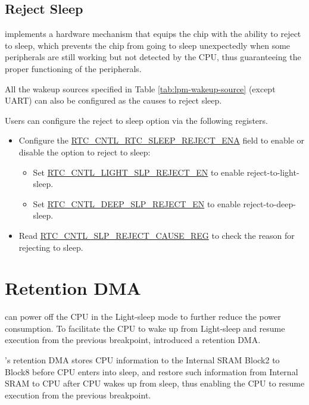 \documentclass[main\_\_EN.tex]{subfiles}
\begin{document}
\subsection{Reject Sleep}\label{sec:lpm-reject-source}

\chipname{} implements a hardware mechanism that equips the chip with the ability to reject to sleep, which prevents the chip from going to sleep unexpectedly when some peripherals are still working but not detected by the CPU, thus guaranteeing the proper functioning of the peripherals.

All the wakeup sources specified in Table \ref{tab:lpm-wakeup-source} (except UART) can also be configured as the causes to reject sleep.

Users can configure the reject to sleep option via the following registers.
\begin{itemize}
    \item Configure the \hyperref[fielddesc:RTCCNTLRTCSLEEPREJECTENA]{RTC\_CNTL\_RTC\_SLEEP\_REJECT\_ENA} field to enable or disable the option to reject to sleep:
        \begin{itemize}
            \item Set \hyperref[fielddesc:RTCCNTLLIGHTSLPREJECTEN]{RTC\_CNTL\_LIGHT\_SLP\_REJECT\_EN} to enable reject-to-light-sleep.
            \item Set \hyperref[fielddesc:RTCCNTLDEEPSLPREJECTEN]{RTC\_CNTL\_DEEP\_SLP\_REJECT\_EN} to enable reject-to-deep-sleep.
        \end{itemize}
    \item Read \hyperref[fielddesc:RTCCNTLREJECTCAUSE]{RTC\_CNTL\_SLP\_REJECT\_CAUSE\_REG} to check the reason for rejecting to sleep.
\end{itemize}

\section{Retention DMA}

\chipname{} can power off the CPU in the Light-sleep mode to further reduce the power consumption. To facilitate the CPU to wake up from Light-sleep and resume execution from the previous breakpoint, \chipname{} introduced a retention DMA.

\chipname{}'s retention DMA stores CPU information to the Internal SRAM Block2 to Block8 before CPU enters into sleep, and restore such information from Internal SRAM to CPU after CPU wakes up from sleep, thus enabling the CPU to resume execution from the previous breakpoint.
\end{document}

